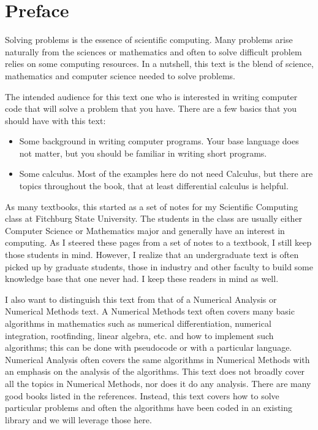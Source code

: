 


\chapter*{Preface}

Solving problems is the essence of scientific computing.  Many problems arise naturally from the sciences or mathematics and often to solve difficult problem relies on some computing resources.  In a nutshell, this text is the blend of science, mathematics and computer science needed to solve problems.  

The intended audience for this text one who is interested in writing computer code that will solve a problem that you have.  There are a few basics that you should have with this text:

\begin{itemize}
\item Some background in writing computer programs.  Your base language does not matter, but you should be familiar in writing short programs.  
\item Some calculus.  Most of the examples here do not need Calculus, but there are topics throughout the book, that at least differential calculus is helpful. 
\end{itemize}


As many textbooks, this started as a set of notes for my Scientific Computing class at Fitchburg State University.  The students in the class are usually either Computer Science or Mathematics major and generally have an interest in computing.  As I steered these pages from a set of notes to a textbook, I still keep those students in mind.  However, I realize that an undergraduate text is often picked up by graduate students, those in industry and other faculty to build some knowledge base that one never had.  I keep these readers in mind as well.  

I also want to distinguish this text from that of a Numerical Analysis or Numerical Methods text.  A Numerical Methods text often covers many basic algorithms in mathematics such as numerical differentiation, numerical integration, rootfinding, linear algebra, etc. and how to implement such algorithms; this can be done with pseudocode or with a particular language.  Numerical Analysis often covers the same algorithms in Numerical Methods with an emphasis on the analysis of the algorithms.  This text does not broadly cover all the topics in Numerical Methods, nor does it do any analysis.  There are many good books listed in the references.  Instead, this text covers how to solve particular problems and often the algorithms have been coded in an existing library and we will leverage those here.  


